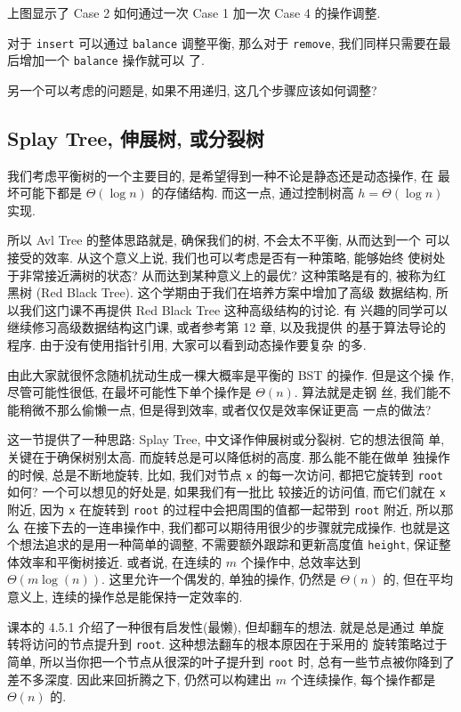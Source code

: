 \documentclass[a4paper]{ctexart}
\theoremstyle{definition}
\theoremstyle{definition}
\begin{document}

上图显示了 Case 2 如何通过一次 Case 1 加一次 Case 4 的操作调整.

对于 \verb|insert| 可以通过 \verb|balance| 调整平衡, 那么对于
\verb|remove|, 我们同样只需要在最后增加一个 \verb|balance| 操作就可以
了. 

另一个可以考虑的问题是, 如果不用递归, 这几个步骤应该如何调整? 

\subsection{Splay Tree, 伸展树, 或分裂树}

我们考虑平衡树的一个主要目的, 是希望得到一种不论是静态还是动态操作, 在
最坏可能下都是 $\Theta(\log n)$ 的存储结构. 而这一点, 通过控制树高
$h = \Theta(\log n)$ 实现.

所以 Avl Tree 的整体思路就是, 确保我们的树, 不会太不平衡, 从而达到一个
可以接受的效率. 从这个意义上说, 我们也可以考虑是否有一种策略, 能够始终
使树处于非常接近满树的状态? 从而达到某种意义上的最优? 这种策略是有的,
被称为红黑树 (Red Black Tree). 这个学期由于我们在培养方案中增加了高级
数据结构, 所以我们这门课不再提供 Red Black Tree 这种高级结构的讨论. 有
兴趣的同学可以继续修习高级数据结构这门课, 或者参考第 12 章, 以及我提供
的基于算法导论的程序. 由于没有使用指针引用, 大家可以看到动态操作要复杂
的多.

由此大家就很怀念随机扰动生成一棵大概率是平衡的 BST 的操作. 但是这个操
作, 尽管可能性很低, 在最坏可能性下单个操作是 $\Theta(n)$. 算法就是走钢
丝, 我们能不能稍微不那么偷懒一点, 但是得到效率, 或者仅仅是效率保证更高
一点的做法?

这一节提供了一种思路: Splay Tree, 中文译作伸展树或分裂树. 它的想法很简
单, 关键在于确保树别太高. 而旋转总是可以降低树的高度. 那么能不能在做单
独操作的时候, 总是不断地旋转, 比如, 我们对节点 \verb|x| 的每一次访问,
都把它旋转到 \verb|root| 如何? 一个可以想见的好处是, 如果我们有一批比
较接近的访问值, 而它们就在 \verb|x| 附近, 因为 \verb|x| 在旋转到
\verb|root| 的过程中会把周围的值都一起带到 \verb|root| 附近, 所以那么
在接下去的一连串操作中, 我们都可以期待用很少的步骤就完成操作. 也就是这
个想法追求的是用一种简单的调整, 不需要额外跟踪和更新高度值
\verb|height|, 保证整体效率和平衡树接近. 或者说, 在连续的 $m$ 个操作中,
总效率达到 $\Theta(m \log(n))$. 这里允许一个偶发的, 单独的操作, 仍然是
$\Theta(n)$ 的, 但在平均意义上, 连续的操作总是能保持一定效率的.

课本的 4.5.1 介绍了一种很有启发性(最懒), 但却翻车的想法. 就是总是通过
单旋转将访问的节点提升到 \verb|root|. 这种想法翻车的根本原因在于采用的
旋转策略过于简单, 所以当你把一个节点从很深的叶子提升到 \verb|root| 时,
总有一些节点被你降到了差不多深度. 因此来回折腾之下, 仍然可以构建出 $m$
个连续操作, 每个操作都是 $\Theta(n)$ 的.
\end{document}
